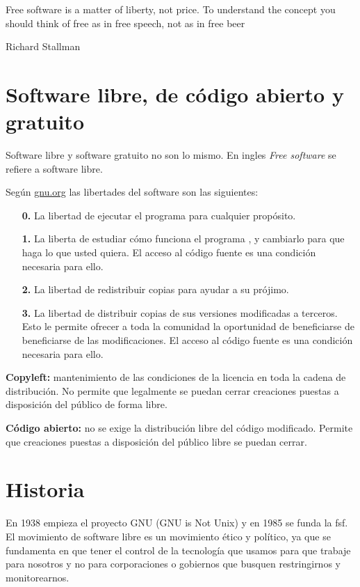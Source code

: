 
\epigraph{Free software is a matter of liberty, not price. To understand the concept you should think of free as in free speech, not as in free beer}{Richard Stallman}

\section{Software libre, de código abierto y gratuito}

Software libre y software gratuito no son lo mismo. En ingles \textit{Free software} se refiere a software libre.

Según \url{gnu.org} las libertades del software son las siguientes:

\begin{itemize}
    \item[\textbf{0.}] La libertad de ejecutar el programa para cualquier propósito.
    \item[\textbf{1.}] La liberta de estudiar cómo funciona el programa , y cambiarlo para que haga lo que usted quiera. El acceso al código fuente es una condición necesaria para ello.
    \item[\textbf{2.}] La libertad de redistribuir copias para ayudar a su prójimo.
    \item[\textbf{3.}] La libertad de distribuir copias de sus versiones modificadas a terceros. Esto le permite ofrecer a toda la comunidad la oportunidad de beneficiarse de beneficiarse de las modificaciones. El acceso al código fuente es una condición necesaria para ello.
\end{itemize}

\textbf{Copyleft:} mantenimiento de las condiciones de la licencia en toda la cadena de distribución. No permite que legalmente se puedan cerrar creaciones puestas a disposición del público de forma libre.

\textbf{Código abierto:} no se exige la distribución libre del código modificado. Permite que creaciones puestas a disposición del público libre se puedan cerrar.

\section{Historia}

En 1938 empieza el proyecto GNU (GNU is Not Unix) y en 1985 se funda la \gls{fsf}. El movimiento de software libre es un movimiento ético y político, ya que se fundamenta en que tener el control de la tecnología que usamos para que trabaje para nosotros y no para corporaciones o gobiernos que busquen restringirnos y monitorearnos.

